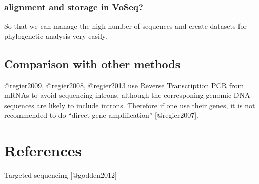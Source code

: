 \documentclass[a4paper]{article}
\begin{document}
\subsubsection{alignment and storage in VoSeq?}

So that we can manage the high number of sequences and create datasets
for phylogenetic analysis very easily.

\subsection{Comparison with other methods}

@regier2009, @regier2008, @regier2013 use Reverse Transcription PCR from
mRNAs to avoid sequencing introns, although the corresponing genomic DNA
sequences are likely to include introns. Therefore if one use their
genes, it is not recommended to do ``direct gene amplification''
{[}@regier2007{]}.

\section{References}

Targeted sequencing {[}@godden2012{]}
\end{document}
